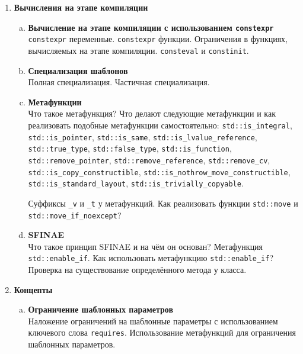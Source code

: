 \documentclass{article}
\begin{document}
\begin{enumerate}
\begin{enumerate}[a.]
\end{enumerate}




\item \textbf{Вычисления на этапе компиляции}
\begin{enumerate}[a.]
\item \textbf{Вычисление на этапе компиляции с использованием \texttt{constexpr}}\\
\texttt{constexpr} переменные. \texttt{constexpr} функции. Ограничения в функциях, вычисляемых на этапе компиляции. \texttt{consteval} и \texttt{constinit}.


\item \textbf{Специализация шаблонов}\\
Полная специализация. Частичная специализация.


\item \textbf{Метафункции}\\
Что такое метафункция? Что делают следующие метафункции и как реализовать подобные метафункции самостоятельно:
\texttt{std::is\_integral}, 
\texttt{std::is\_pointer},
\texttt{std::is\_same},
\texttt{std::is\_lvalue\_reference},
\texttt{std::true\_type},
\texttt{std::false\_type},
\texttt{std::is\_function},
\texttt{std::remove\_pointer},
\texttt{std::remove\_reference},
\texttt{std::remove\_cv},
\texttt{std::is\_copy\_constructible},
\texttt{std::is\_nothrow\_move\_constructible},\\
\texttt{std::is\_standard\_layout},
\texttt{std::is\_trivially\_copyable}.


Суффиксы \texttt{\_v} и \texttt{\_t} у метафункций.
Как реализовать функции \texttt{std::move} и \texttt{std::move\_if\_noexcept}?

\item \textbf{SFINAE}\\
Что такое принцип SFINAE и на чём он основан? Метафункция \texttt{std::enable\_if}. Как использовать метафункцию \texttt{std::enable\_if}?
Проверка на существование определённого метода у класса.
\end{enumerate}


\item \textbf{Концепты}
\begin{enumerate}[a.]

\item \textbf{Ограничение шаблонных параметров}\\
Наложение ограничений на шаблонные параметры с использованием ключевого слова \texttt{requires}.
Использование метафункций для ограничения шаблонных параметров.



\end{enumerate}
\end{enumerate}
\end{document}
